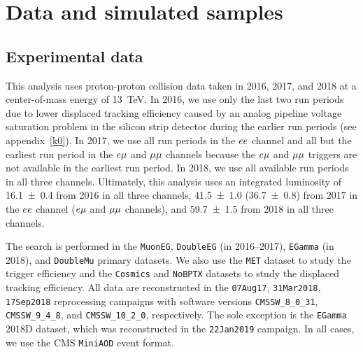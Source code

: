 \section{Data and simulated samples}
\label{samples}

\subsection{Experimental data}
This analysis uses proton-proton collision data taken in 2016, 2017, and 2018 at a center-of-mass energy of \SI{13}{\TeV}. In 2016, we use only the last two run periods due to lower displaced tracking efficiency caused by an analog pipeline voltage saturation problem in the silicon strip detector during the earlier run periods (see appendix~\ref{k0}). In 2017, we use all run periods in the $ee$ channel and all but the earliest run period in the $e{\mu}$ and ${\mu}{\mu}$ channels because the $e{\mu}$ and ${\mu}{\mu}$ triggers are not available in the earliest run period. In 2018, we use all available run periods in all three channels. Ultimately, this analysis uses an integrated luminosity of \SI{16.1\pm0.4}{\fb} from 2016 in all three channels, \SI{41.5\pm1.0}{\fb} (\SI{36.7\pm0.8}{\fb}) from 2017 in the $ee$ channel ($e{\mu}$ and ${\mu}{\mu}$ channels), and \SI{59.7\pm1.5}{\fb} from 2018 in all three channels.

The search is performed in the \texttt{MuonEG}, \texttt{DoubleEG} (in 2016--2017), \texttt{EGamma} (in 2018), and \texttt{DoubleMu} primary datasets. We also use the \texttt{MET} dataset to study the trigger efficiency and the \texttt{Cosmics} and \texttt{NoBPTX} datasets to study the displaced tracking efficiency. All data are reconstructed in the \texttt{07Aug17}, \texttt{31Mar2018}, \texttt{17Sep2018} reprocessing campaigns with software versions \texttt{CMSSW\_8\_0\_31}, \texttt{CMSSW\_9\_4\_8}, and \texttt{CMSSW\_10\_2\_0}, respectively. The sole exception is the \texttt{EGamma} 2018D dataset, which was reconstructed in the \texttt{22Jan2019} campaign. In all cases, we use the CMS \texttt{MiniAOD} event format.

